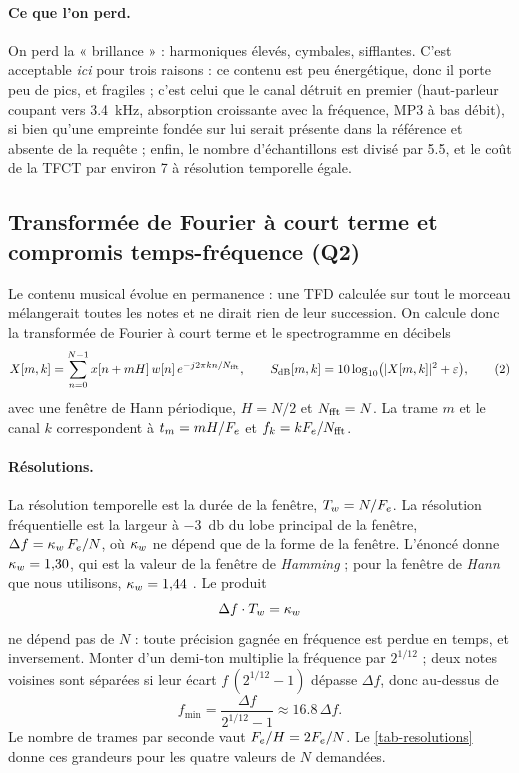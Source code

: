 \paragraph{Ce que l'on perd.} On perd la « brillance » : harmoniques élevés, cymbales,
sifflantes. C'est acceptable \emph{ici} pour trois raisons : ce contenu est peu énergétique,
donc il porte peu de pics, et fragiles ; c'est celui que le canal détruit en premier
(haut-parleur coupant vers \qty{3.4}{\kilo\hertz}, absorption croissante avec la fréquence,
MP3 à bas débit), si bien qu'une empreinte fondée sur lui serait présente dans la référence
et absente de la requête ; enfin, le nombre d'échantillons est divisé par
\num{5.5}, et le coût de la TFCT par environ 7 à résolution temporelle égale.

\subsection{Transformée de Fourier à court terme et compromis temps-fréquence (Q2)}
\label{sec-tfct}

Le contenu musical évolue en permanence : une TFD calculée sur tout le morceau
mélangerait toutes les notes et ne dirait rien de leur succession. On calcule donc la
transformée de Fourier à court terme et le spectrogramme en décibels
\begin{equation}
  X[m,k] = \sum_{n=0}^{N-1} x[n+mH]\, w[n]\, e^{-j2\pi kn/N_{\mathrm{fft}}},
  \qquad
  S_{\mathrm{dB}}[m,k] = 10\log_{10}\bigl(|X[m,k]|^2 + \varepsilon\bigr),
  \tag{2}
\end{equation}
avec une fenêtre de Hann périodique, $H = N/2$ et $N_{\mathrm{fft}} = N$. La trame $m$ et le canal $k$
correspondent à $t_m = mH/F_e$ et $f_k = kF_e/N_{\mathrm{fft}}$.

\paragraph{Résolutions.} La résolution temporelle est la durée de la fenêtre,
$T_w = N/F_e$. La résolution fréquentielle est la largeur à \qty{-3}{\decibel} du lobe
principal de la fenêtre, $\Delta f = \kappa_w\,F_e/N$, où $\kappa_w$ ne dépend que de la forme de la
fenêtre. L'énoncé donne $\kappa_w = \num{1.30}$, qui est la valeur de la fenêtre de
\emph{Hamming} ; pour la fenêtre de \emph{Hann} que nous utilisons, $\kappa_w = \num{1.44}$
\cite{harris1978}. Le produit
\begin{equation}
  \Delta f \cdot T_w = \kappa_w
\end{equation}
ne dépend pas de $N$ : toute précision gagnée en fréquence est perdue en temps, et
inversement. Monter d'un demi-ton multiplie la fréquence par $2^{1/12}$ ; deux notes voisines
sont séparées si leur écart $f\,(2^{1/12}-1)$ dépasse $\Delta f$, donc au-dessus de
\begin{equation}
  f_{\min} = \frac{\Delta f}{2^{1/12}-1} \approx \num{16.8}\,\Delta f .
\end{equation}
Le nombre de trames par seconde vaut $F_e/H = 2F_e/N$. Le \cref{tab-resolutions} donne
ces grandeurs pour les quatre valeurs de $N$ demandées.

